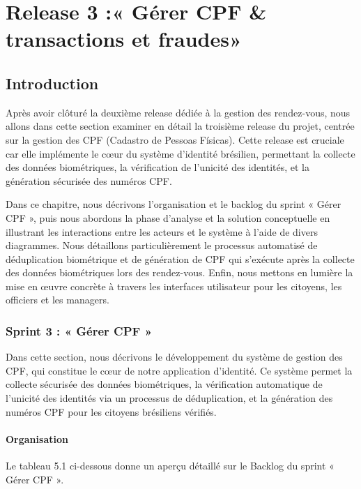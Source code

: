 \chapter{Release 3 :« Gérer CPF \& transactions et fraudes» }
\label{chap_sprint3}
\section*{Introduction}
\label{sec_introduction:ch4}
Après avoir clôturé la deuxième release dédiée à la gestion des rendez-vous, nous allons dans cette section examiner en détail la troisième release du projet, centrée sur la gestion des CPF (Cadastro de Pessoas Físicas). Cette release est cruciale car elle implémente le cœur du système d'identité brésilien, permettant la collecte des données biométriques, la vérification de l'unicité des identités, et la génération sécurisée des numéros CPF.

Dans ce chapitre, nous décrivons l'organisation et le backlog du sprint « Gérer CPF », puis nous abordons la phase d'analyse et la solution conceptuelle en illustrant les interactions entre les acteurs et le système à l'aide de divers diagrammes. Nous détaillons particulièrement le processus automatisé de déduplication biométrique et de génération de CPF qui s'exécute après la collecte des données biométriques lors des rendez-vous. Enfin, nous mettons en lumière la mise en œuvre concrète à travers les interfaces utilisateur pour les citoyens, les officiers et les managers.

\subsection {Sprint 3 : « Gérer CPF »}
Dans cette section, nous décrivons le développement du système de gestion des CPF, qui constitue le cœur de notre application d'identité. Ce système permet la collecte sécurisée des données biométriques, la vérification automatique de l'unicité des identités via un processus de déduplication, et la génération des numéros CPF pour les citoyens brésiliens vérifiés.
\subsubsection{Organisation}
Le tableau 5.1 ci-dessous donne un aperçu détaillé sur le Backlog du sprint « Gérer CPF ».

